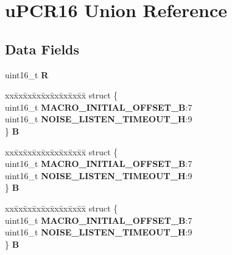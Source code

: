 \hypertarget{unionuPCR16}{}\section{u\+P\+C\+R16 Union Reference}
\label{unionuPCR16}
\subsection*{Data Fields}
\begin{DoxyCompactItemize}
\item 
\mbox{\label{unionuPCR16_a03a965e4918c77767d73b334aa9d8512}} 
uint16\+\_\+t {\bfseries R}
\item 
\mbox{\label{unionuPCR16_a304471e7c746660835a0c02a2e21cb4f}} 
\begin{tabbing}
xx\=xx\=xx\=xx\=xx\=xx\=xx\=xx\=xx\=\kill
struct \{\\
\>uint16\_t {\bfseries MACRO\_INITIAL\_OFFSET\_B}:7\\
\>uint16\_t {\bfseries NOISE\_LISTEN\_TIMEOUT\_H}:9\\
\} {\bfseries B}\\

\end{tabbing}\item 
\mbox{\label{unionuPCR16_ac3fde2ff224c90effae84b40c8e5aa95}} 
\begin{tabbing}
xx\=xx\=xx\=xx\=xx\=xx\=xx\=xx\=xx\=\kill
struct \{\\
\>uint16\_t {\bfseries MACRO\_INITIAL\_OFFSET\_B}:7\\
\>uint16\_t {\bfseries NOISE\_LISTEN\_TIMEOUT\_H}:9\\
\} {\bfseries B}\\

\end{tabbing}\item 
\mbox{\label{unionuPCR16_a02f585d886f3f8e72124e688349d5df1}} 
\begin{tabbing}
xx\=xx\=xx\=xx\=xx\=xx\=xx\=xx\=xx\=\kill
struct \{\\
\>uint16\_t {\bfseries MACRO\_INITIAL\_OFFSET\_B}:7\\
\>uint16\_t {\bfseries NOISE\_LISTEN\_TIMEOUT\_H}:9\\
\} {\bfseries B}\\


\end{tabbing}
\end{DoxyCompactItemize}
